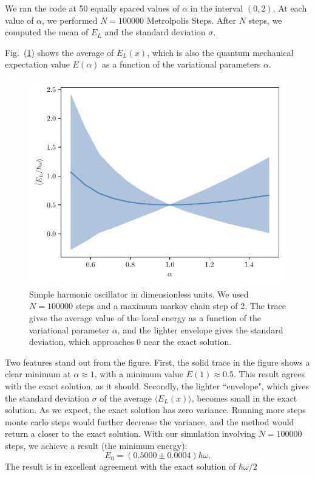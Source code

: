 \documentclass[12pt]{article}
\numberwithin{equation}{section}
\begin{document}
We ran the code at 50 equally spaced values of $\alpha$ in the interval $(0, 2)$.  At each value of $\alpha$, we performed $N = 100 000$ Metrolpolis Steps.  After $N$ steps, we computed the mean of $E_L$ and the standard deviation $\sigma$.

Fig.~(\ref{fig:sho}) shows the average of $E_L(x)$, which is also the quantum mechanical expectation value $E(\alpha)$ as a function of the variational parameters $\alpha$.
\begin{figure}[ht]
    \centering
    \includegraphics{../scripts/sho.pdf}
    \caption{Simple harmonic oscillator in dimensionless units.  We used $N = 100 000$ steps and a maximum markov chain step of 2.  The trace givse the average value of the local energy as a function of the variational parameter $\alpha$, and the lighter envelope gives the standard deviation, which approaches 0 near the exact solution.}
    \label{fig:sho}
\end{figure}
Two features stand out from the figure.  First, the solid trace in the figure shows a clear minimum at $\alpha \approx 1$, with a minimum value $E(1) \approx 0.5$.  This result agrees with the exact solution, as it should.  Secondly, the lighter ``envelope", which gives the standard deviation $\sigma$ of the average $\langle E_L(x) \rangle$, becomes small in the exact solution.  As we expect, the exact solution has zero variance.  Running more steps monte carlo steps would further decrease the variance, and the method would return a closer to the exact solution.  With our simulation involving $N = 100 000$ steps, we achieve a result (the minimum energy):
\begin{equation}
    E_0 = (0.5000 \pm 0.0004) \hbar \omega. \nonumber
\end{equation}
The result is in excellent agreement with the exact solution of $\hbar \omega / 2$
\end{document}
